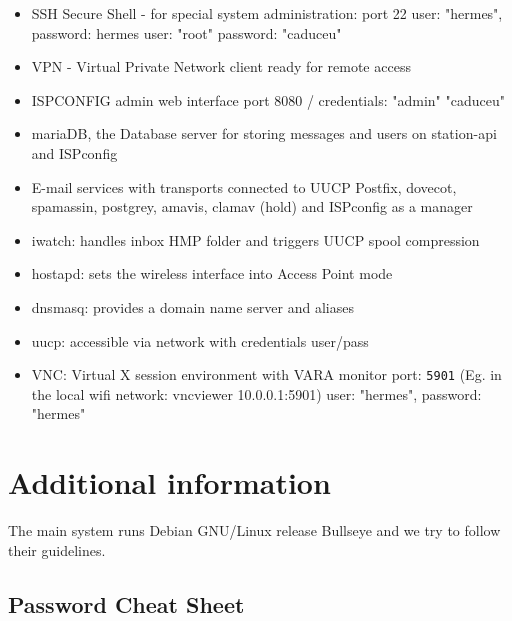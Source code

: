 \begin{itemize}
    \item SSH Secure Shell - for special system administration: port 22\newline
        \hfill user: "hermes", password: hermes\newline
        \hfill user: "root" password: "caduceu"
    \item VPN -  Virtual Private Network client ready for remote access
    \item ISPCONFIG admin web interface\newline
        \hfill port 8080 / credentials: "admin" "caduceu"
    \item mariaDB, the Database server for storing messages and users on station-api and ISPconfig
    \item E-mail services with transports connected to UUCP\newline
        \hfill Postfix, dovecot, spamassin, postgrey, amavis, clamav (hold) and ISPconfig as a manager 
    \item iwatch: handles inbox HMP folder and triggers UUCP spool compression
    \item hostapd: sets the wireless interface into Access Point mode
    \item dnsmasq: provides a domain name server and aliases 
    \item uucp: accessible via network with credentials user/pass%
    \item VNC: Virtual X session environment with VARA monitor
        \hfill port: \texttt{5901} (Eg. in the local wifi network: vncviewer 10.0.0.1:5901) 
        \hfill user: "hermes", password: "hermes"
\end{itemize}

\section{Additional information}
\label{apx_adit_info}
    The main system runs Debian GNU/Linux release Bullseye and we try to follow their guidelines.

\subsection{Password Cheat Sheet}
\label{passwords}


